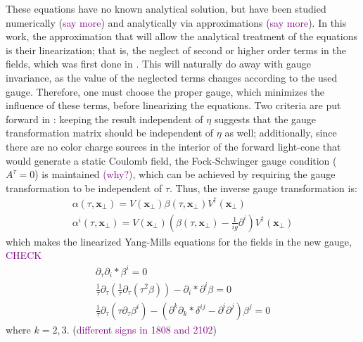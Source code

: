 These equations have no known analytical solution, but have been studied numerically (\textcolor{purple}{say more}) and analytically via approximations (\textcolor{purple}{say more}). In this work, the approximation that will allow the analytical treatment of the equations is their linearization; that is, the neglect of second or higher order terms in the fields, which was first done in \cite{}. This  will naturally do away with gauge invariance, as the value of the neglected terms changes according to the used gauge. Therefore, one must choose the proper gauge, which minimizes the influence of these terms, before linearizing the equations. Two criteria are put forward in \cite{Guerrero-Rodriguez:2021ask}: keeping the result independent of $\eta$ suggests that the gauge transformation matrix should be independent of $\eta$ as well; additionally, since there are no color charge sources in the interior of the forward light-cone that would generate a static Coulomb field,
the Fock-Schwinger gauge condition ($A^\tau = 0$) is maintained \textcolor{purple}{(why?)}, which can be achieved by requiring the gauge transformation to be independent of $\tau$. Thus, the inverse gauge transformation is:
\begin{subequations}
\begin{gather}
	\alpha(\tau,\mathbf{x}_\perp) = V (\mathbf{x}_\perp) \beta(\tau,\mathbf{x}_\perp) V^\dagger (\mathbf{x}_\perp) \\
	\alpha^i(\tau,\mathbf{x}_\perp) = V (\mathbf{x}_\perp) \left( \beta(\tau,\mathbf{x}_\perp) - \frac{1}{ig} \partial^i \right) V^\dagger (\mathbf{x}_\perp)
\end{gather}
\end{subequations}
which makes the linearized Yang-Mills equations for the fields in the new gauge, \textcolor{purple}{CHECK}
\begin{subequations}
	\begin{gather}
		\partial_\tau \partial_i* \beta^i = 0 \\
		\frac{1}{\tau} \partial_\tau \left( \frac{1}{\tau} \partial_\tau \left( \tau^2 \beta \right) \right) - \partial_i* \partial^i \beta = 0 \\
		\frac{1}{\tau} \partial_\tau \left( \tau \partial_\tau \beta^i \right) - \left( \partial^k \partial_k* \delta^{i j} - \partial^i \partial^j \right) \beta^j =0
	\end{gather}
\end{subequations}
where $k=2,3$. (\textcolor{purple}{different signs in 1808 and 2102})

